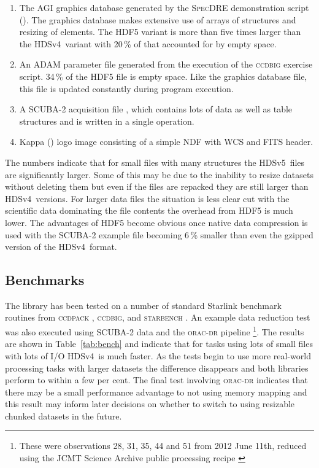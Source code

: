 \documentclass[final,authoryear,5p,times,twocolumn]{elsarticle}
\newcommand{\new}{HDSv5}
\newcommand{\old}{HDSv4}
\begin{document}
\begin{enumerate}
\item The AGI graphics database generated by the \textsc{SpecDRE}
  demonstration script (). The graphics database makes
  extensive use of arrays of structures and resizing of elements. The
  HDF5 variant is more than five times larger than the \old\ variant
  with 20\,\% of that accounted for by empty space.

\item An ADAM parameter file generated from the execution of the
  \textsc{ccdbig} \citep{SSN69} exercise script. 34\,\% of the HDF5
  file is empty space. Like the graphics database file, this file is
  updated constantly during program execution.

\item A SCUBA-2 acquisition file \citep{2014SPIE.9153E..03B}, which contains
  lots of data as well as table structures and is written in a single operation.

\item Kappa () logo image consisting of a simple NDF
  with WCS and FITS header.
\end{enumerate}

The numbers indicate that for small files with many structures the
\new\ files are significantly larger. Some of this may be due to the
inability to resize datasets without deleting them but even if the
files are repacked they are still larger than \old\ versions.  For
larger data files the situation is less clear cut with the scientific
data dominating the file contents the overhead from HDF5 is much
lower. The advantages of HDF5 become obvious once native data
compression is used with the SCUBA-2 example file becoming 6\,\%
smaller than even the gzipped version of the \old\ format.


\subsection{Benchmarks}

The library has been tested on a number of standard Starlink benchmark
routines from \textsc{ccdpack} \citep[][]{SUN139},
\textsc{ccdbig}, and \textsc{starbench} \citep{SSN23}. An example data reduction
test was also executed using SCUBA-2 data and the \textsc{orac-dr}
pipeline \citep[][]{2015A&C.....9...40J}\footnote{These were
  observations 28, 31, 35, 44 and 51  from 2012 June 11th, reduced
  using the JCMT Science Archive public processing recipe
  \citep{2014SPIE9152-93}}. The results are shown in
Table~\ref{tab:bench} and indicate that for tasks using lots of small
files with lots of I/O \old\ is much faster. As the tests begin to use
more real-world processing tasks with larger datasets the difference
disappears and both libraries perform to within a few per cent. The
final test involving \textsc{orac-dr} indicates that there may be a
small performance advantage to not using memory mapping and this
result may inform later decisions on whether to switch to using
resizable chunked datasets in the future.
\end{document}
